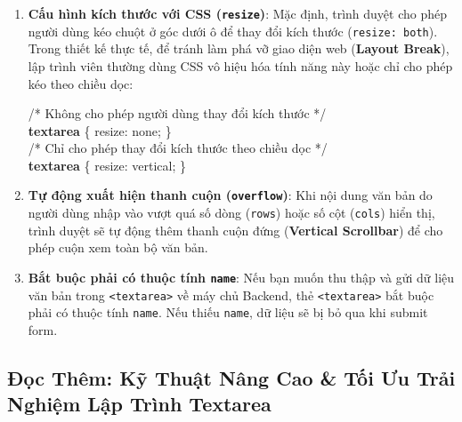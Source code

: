 \documentclass[11pt,oneside]{book}
\newcommand{\codeinline}[1]{\textcolor{accentOrange}{\texttt{#1}}}
\newcommand{\term}[1]{\textbf{\textcolor{primaryBlue}{#1}}}
\begin{document}
\begin{warnBox}
\begin{enumerate}[leftmargin=1.5em, itemsep=6pt, parsep=0pt]
    \item \textbf{Cấu hình kích thước với CSS (\codeinline{resize})}:
    Mặc định, trình duyệt cho phép người dùng kéo chuột ở góc dưới ô để thay đổi kích thước (\codeinline{resize: both}). Trong thiết kế thực tế, để tránh làm phá vỡ giao diện web (\term{Layout Break}), lập trình viên thường dùng CSS vô hiệu hóa tính năng này hoặc chỉ cho phép kéo theo chiều dọc:
    \par\vspace{4pt}
    \begin{center}
    \begin{tcolorbox}[arc=3pt, colback=white, colframe=primaryBlue!30, boxsep=5pt, left=12pt, right=12pt, top=5pt, bottom=5pt, width=0.85\linewidth]
      \small\ttfamily
      \textcolor{codeComment}{/* Không cho phép người dùng thay đổi kích thước */}\\
      \textcolor{primaryBlue}{\textbf{textarea}} \{ \textcolor{codeComment}{resize}: \textcolor{red!80!black}{none}; \}\\[6pt]
      \textcolor{codeComment}{/* Chỉ cho phép thay đổi kích thước theo chiều dọc */}\\
      \textcolor{primaryBlue}{\textbf{textarea}} \{ \textcolor{codeComment}{resize}: \textcolor{red!80!black}{vertical}; \}
    \end{tcolorbox}
    \end{center}
    \par\vspace{2pt}

    \item \textbf{Tự động xuất hiện thanh cuộn (\codeinline{overflow})}:
    Khi nội dung văn bản do người dùng nhập vào vượt quá số dòng (\codeinline{rows}) hoặc số cột (\codeinline{cols}) hiển thị, trình duyệt sẽ tự động thêm thanh cuộn đứng (\term{Vertical Scrollbar}) để cho phép cuộn xem toàn bộ văn bản.

    \item \textbf{Bắt buộc phải có thuộc tính \codeinline{name}}:
    Nếu bạn muốn thu thập và gửi dữ liệu văn bản trong \codeinline{<textarea>} về máy chủ Backend, thẻ \codeinline{<textarea>} bắt buộc phải có thuộc tính \codeinline{name}. Nếu thiếu \codeinline{name}, dữ liệu sẽ bị bỏ qua khi submit form.
\end{enumerate}
\end{warnBox}

\subsection{Đọc Thêm: Kỹ Thuật Nâng Cao \& Tối Ưu Trải Nghiệm Lập Trình Textarea}
\end{document}
